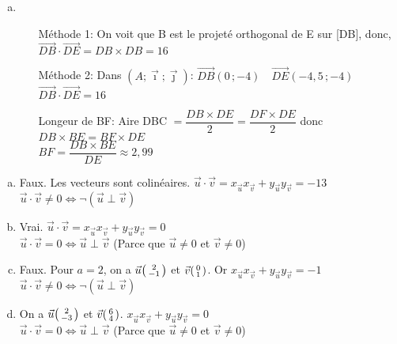 \documentclass[12pt, a4paper]{article}
\begin{document}
\begin{Exercise}[number={63}]
\begin{enumerate}[a)]
\begin{itemize}[leftmargin=3cm]
          \end{itemize} \bigbreak
    \item \begin{itemize}[leftmargin=3cm]
            \item[Méthode 1:] On voit que B est le projeté orthogonal de E sur [DB], donc, \medskip \\ $\overrightarrow{DB}\cdot\overrightarrow{DE}=DB\times DB=16$ \bigbreak
            \item[Méthode 2:] Dans $(A;\overrightarrow{\imath};\overrightarrow{\jmath})$: $\overrightarrow{DB}(0\,;-4) \quad \overrightarrow{DE}(-4{,}5\,;-4)$ \smallskip \\ $\overrightarrow{DB}\cdot\overrightarrow{DE}=16$ \bigbreak
            \item[Longeur de BF:] Aire DBC $=\dfrac{DB\times DE}{2}=\dfrac{DF\times DE}{2}$ donc $DB\times BE=BF\times DE$ \medskip \\ $BF=\dfrac{DB\times BE}{DE}\approx2{,}99$
          \end{itemize}
  \end{enumerate}  
\end{Exercise}

\pagebreak

\begin{Exercise}[number={65}]
  \begin{enumerate}[a)]
    \item Faux. Les vecteurs sont colinéaires. $\vec{u}\cdot\vec{v}=x_{\vec{u}} x_{\vec{v}}+y_{\vec{u}} y_{\vec{v}}=-13$ \\ $\vec{u}\cdot\vec{v}\neq0\iff\lnot(\vec{u}\perp \vec{v})$
    \item Vrai. $\vec{u}\cdot\vec{v}=x_{\vec{u}} x_{\vec{v}}+y_{\vec{u}} y_{\vec{v}}=0$ \\ $\vec{u}\cdot\vec{v}=0\iff \vec{u}\perp \vec{v}$ \quad (Parce que $\vec{u}\neq0$ et $\vec{v}\neq0$)
    \item Faux. Pour $a=2$, on a $\vec{u}\begin{psmallmatrix}2\\-1\end{psmallmatrix}$ et $ \vec{v}\begin{psmallmatrix}0\\1\end{psmallmatrix}$. Or $x_{\vec{u}}x_{\vec{v}}+y_{\vec{u}}y_{\vec{v}}=-1$ \\ $\vec{u}\cdot\vec{v}\neq0\iff\lnot(\vec{u}\perp \vec{v})$
    \item On a $\vec{u}\begin{psmallmatrix}2\\-3\end{psmallmatrix}$ et $\vec{v}\begin{psmallmatrix}6\\4\end{psmallmatrix}$. $x_{\vec{u}}x_{\vec{v}}+y_{\vec{u}}y_{\vec{v}}=0$ \\ $\vec{u}\cdot\vec{v}=0\iff \vec{u}\perp \vec{v}$ \quad (Parce que $\vec{u}\neq0$ et $\vec{v}\neq0$)
  \end{enumerate}
\end{Exercise}
\end{document}
